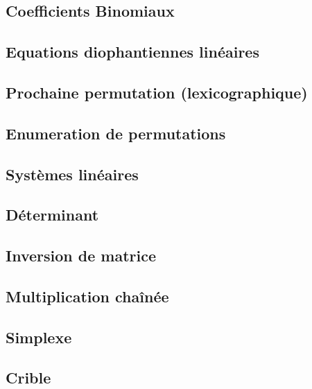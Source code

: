 \documentclass[10pt]{article}
\begin{document}
\subsection{Coefficients Binomiaux}
{\scriptsize}

\subsection{Equations diophantiennes linéaires}
{\scriptsize}

\subsection{Prochaine permutation (lexicographique)}
{\scriptsize}

\subsection{Enumeration de permutations}
{\scriptsize}

\subsection{Systèmes linéaires}
{\scriptsize}

\subsection{Déterminant}
{\scriptsize}

\subsection{Inversion de matrice}
{\scriptsize}

\subsection{Multiplication chaînée}
{\scriptsize}

\subsection{Simplexe}
{\scriptsize}
 
\subsection{Crible}
{\scriptsize}
\end{document}
